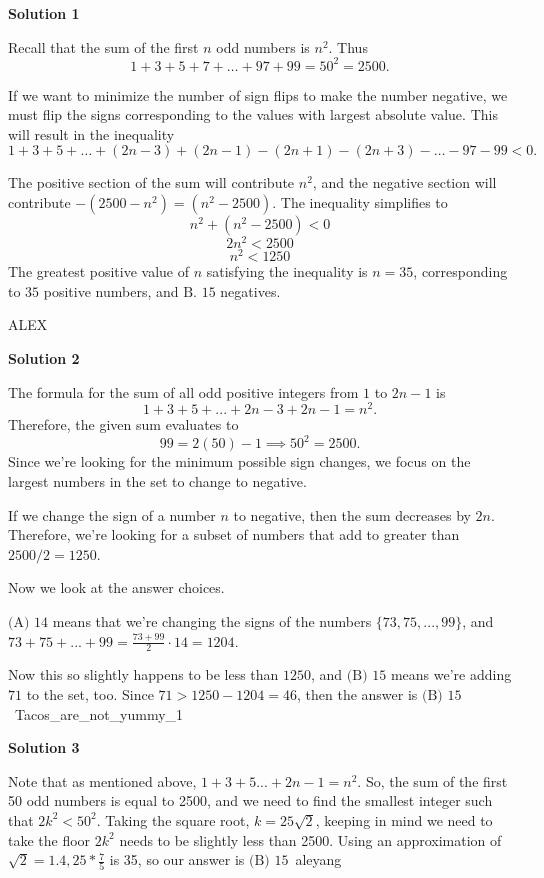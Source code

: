\begin{enumerate}
\textbf{Solution 1}

Recall that the sum of the first $n$ odd numbers is $n^2$. Thus 
 \[1 + 3 + 5 + 7+ \dots + 97 + 99 = 50^2 = 2500.\]

 If we want to minimize the number of sign flips to make the number negative, we must flip the signs corresponding to the values with largest absolute value. This will result in the inequality 
 \[1 + 3 + 5 +\dots + (2n - 3) + (2n - 1) - (2n + 1) - (2n + 3)-\dots - 97 - 99 < 0.\]

 The positive section of the sum will contribute $n^2$, and the negative section will contribute $-(2500-n^2) = (n^2 - 2500)$. The inequality simplifies to
 \[n^2 + (n^2 - 2500) < 0\]
 \[2n^2 < 2500\]
 \[n^2 < 1250\]The greatest positive value of $n$ satisfying the inequality is $n = 35$, corresponding to $35$ positive numbers, and $\boxed{\text{B. } 15}$ negatives.

 ALEX

 



\textbf{Solution 2}

The formula for the sum of all odd positive integers from $1$ to $2n-1$ is 
 \[1+3+5+...+2n-3+2n-1=n^2.\]Therefore, the given sum evaluates to 
 \[99=2(50)-1\implies 50^2=2500.\] Since we're looking for the minimum possible sign changes, we focus on the largest numbers in the set to change to negative.

 If we change the sign of a number $n$ to negative, then the sum decreases by $2n$. Therefore, we're looking for a subset of numbers that add to greater than $2500/2=1250$.

 Now we look at the answer choices.

 $\text{(A) }14$ means that we're changing the signs of the numbers $\{73,75,...,99\}$, and $73+75+...+99=\frac{73+99}{2} \cdot 14=1204$. 

 Now this so slightly happens to be less than $1250$, and $\text{(B) } 15$ means we're adding $71$ to the set, too. Since $71>1250-1204=46$, then the answer is $\boxed{\text{(B) }15}$ ~Tacos\_are\_not\_yummy\_1

 



\textbf{Solution 3}

Note that as mentioned above, $1 + 3 + 5... + 2n - 1 = n^{2}$. So, the sum of the first 50 odd numbers is equal to 2500, and we need to find the smallest integer such that $2k^{2} < 50^{2}$. Taking the square root, $k = 25\sqrt{2}$, keeping in mind we need to take the floor $2k^{2}$ needs to be slightly less than 2500. Using an approximation of $\sqrt{2} = 1.4, 25 * \frac{7}{5}$ is 35, so our answer is $\boxed{\text{(B) }15}$~aleyang


\end{enumerate}
